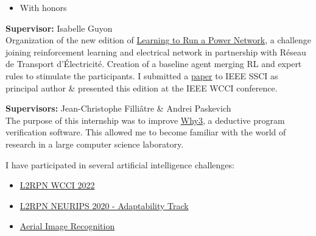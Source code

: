 \documentclass[10pt,a4paper,ragged2e,withhyper]{altacv}
\newcommand{\hrefc}[2]{\href{#1}{\textcolor{ThirdColor}{#2}}}
\begin{document}
\begin{paracol}{2}
            \begin{itemize}
                \item With honors
            \end{itemize}
            

        
        \textbf{Supervisor:} Isabelle Guyon\\
        \vspace{3pt}
        Organization of the new edition of
        \hrefc{https://l2rpn.chalearn.org/}{Learning to Run a Power Network},
        a challenge joining reinforcement learning and electrical network
        in partnership with Réseau de Transport d'Électricité.
        Creation of a baseline agent merging RL and expert rules to stimulate the participants.
        I submitted a \hrefc{https://arxiv.org/abs/2207.10330}{paper} to IEEE SSCI as principal
        author \& presented this edition at the IEEE WCCI conference.

        \divider

        \textbf{Supervisors:} Jean-Christophe Filliâtre \& Andrei Paskevich\\
        \vspace{3pt}
        The purpose of this internship was to improve \hrefc{http://why3.lri.fr/}{Why3},
        a deductive program verification software.
        This allowed me to become familiar with the world of research in a
        large computer science laboratory.

        \pagebreak

          I have participated in several artificial intelligence challenges:
          \vspace{4pt}
          \begin{itemize}
            \item \hrefc{https://codalab.lisn.upsaclay.fr/competitions/5410}{L2RPN WCCI 2022}
            \item \hrefc{https://competitions.codalab.org/competitions/25427}{L2RPN NEURIPS 2020 - Adaptability Track}
            \item \hrefc{https://codalab.lisn.upsaclay.fr/competitions/573}{Aerial Image Recognition}
          \end{itemize}


\end{paracol}
\end{document}
